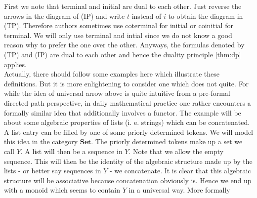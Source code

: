 First we note that terminal and initial are dual to each other. Just reverse the arrows in the diagram of (IP) and write $t$ instead of $i$ to obtain the diagram in (TP). Therefore authors sometimes use coterminal for initial or coinitial for terminal. We will only use terminal and intial since we do not know a good reason why to prefer the one over the other. Anyways, the formulas denoted by (TP) and (IP)
 are dual to each other and hence the duality principle \ref{thm:dp} applies.
\\
Actually, there should follow some examples here which illustrate these definitions. But it is more enlightening to consider one which does not quite. For while the idea of universal arrow above is quite intuitive from a pre-formal directed path perspective, in daily mathematical practice one rather encounters a formally similar idea that additionally involves a functor. The example will be about some algebraic properties of lists (i. e. strings) which can be concatenated. A list entry can be filled by one of some priorly determined tokens. We will model this idea in the category $\mathbf{Set}$. The priorly determined tokens make up a set we call $Y$. A list will then be a sequence in $Y$. Note that we allow the empty sequence. This will then be the identity of the algebraic structure made up by the lists - or better say sequences in $Y$ - we concatenate. It is clear that this algebraic structure will be associative because concatenation obviously is. Hence we end up with a monoid which seems to contain $Y$ in a {\glqq}universal way{\grqq}. More formally
\\

